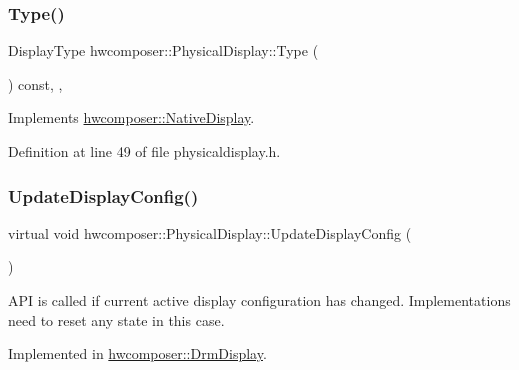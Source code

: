 \subsubsection{\texorpdfstring{Type()}{Type()}}
{\footnotesize\ttfamily Display\+Type hwcomposer\+::\+Physical\+Display\+::\+Type (\begin{DoxyParamCaption}{ }\end{DoxyParamCaption}) const\hspace{0.3cm}{\ttfamily [inline]}, {\ttfamily [override]}, {\ttfamily [virtual]}}



Implements \mbox{\hyperlink{classhwcomposer_1_1NativeDisplay_a67018275066174f9e5d4b801cd6fea31}{hwcomposer\+::\+Native\+Display}}.



Definition at line 49 of file physicaldisplay.\+h.


\begin{DoxyCode}{0}
\end{DoxyCode}
\mbox{\label{classhwcomposer_1_1PhysicalDisplay_aa3cb8537967c34dce7e8ba7762cbd48c}} 
\subsubsection{\texorpdfstring{Update\+Display\+Config()}{UpdateDisplayConfig()}}
{\footnotesize\ttfamily virtual void hwcomposer\+::\+Physical\+Display\+::\+Update\+Display\+Config (\begin{DoxyParamCaption}{ }\end{DoxyParamCaption})\hspace{0.3cm}{\ttfamily [pure virtual]}}

A\+PI is called if current active display configuration has changed. Implementations need to reset any state in this case. 

Implemented in \mbox{\hyperlink{classhwcomposer_1_1DrmDisplay_aa235de1fc4a01177e1afea36d4554870}{hwcomposer\+::\+Drm\+Display}}.

\mbox{\label{classhwcomposer_1_1PhysicalDisplay_a58541ff74976131b84a4dac060a48c45}} 
